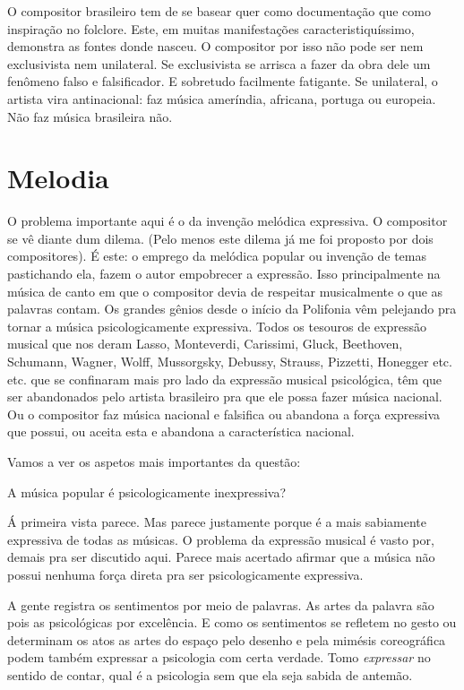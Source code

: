 O compositor brasileiro tem de se basear quer como documentação que como
inspiração no folclore. Este, em muitas manifestações
caracteristiquíssimo, demonstra as fontes donde nasceu. O compositor por
isso não pode ser nem exclusivista nem unilateral. Se exclusivista se
arrisca a fazer da obra dele um fenômeno falso e falsificador. E
sobretudo facilmente fatigante. Se unilateral, o artista vira
antinacional: faz música ameríndia, africana, portuga ou europeia. Não
faz música brasileira não.

\section{Melodia}

O problema importante aqui é o da invenção melódica expressiva. O
compositor se vê diante dum dilema. (Pelo menos este dilema já me foi
proposto por dois compositores). É este: o emprego da melódica popular
ou invenção de temas pastichando ela, fazem o autor empobrecer a
expressão. Isso principalmente na música de canto em que o compositor
devia de respeitar musicalmente o que as palavras contam. Os grandes
gênios desde o início da Polifonia vêm pelejando pra tornar a música
psicologicamente expressiva. Todos os tesouros de expressão musical que
nos deram Lasso, Monteverdi, Carissimi, Gluck, Beethoven, Schumann,
Wagner, Wolff, Mussorgsky, Debussy, Strauss, Pizzetti, Honegger etc.
etc. que se confinaram mais pro lado da expressão musical psicológica,
têm que ser abandonados pelo artista brasileiro pra que ele possa fazer
música nacional. Ou o compositor faz música nacional e falsifica ou
abandona a força expressiva que possui, ou aceita esta e abandona a
característica nacional.

Vamos a ver os aspetos mais importantes da questão:

A música popular é psicologicamente inexpressiva?

Á primeira vista parece. Mas parece justamente porque é a mais
sabiamente expressiva de todas as músicas. O problema da expressão
musical é vasto por, demais pra ser discutido aqui. Parece mais acertado
afirmar que a música não possui nenhuma força direta pra ser
psicologicamente expressiva.

A gente registra os sentimentos por meio de palavras. As artes da
palavra são pois as psicológicas por excelência. E como os sentimentos
se refletem no gesto ou determinam os atos as artes do espaço pelo
desenho e pela mimésis coreográfica podem também expressar a psicologia
com certa verdade. Tomo \emph{expressar} no sentido de contar, qual é a
psicologia sem que ela seja sabida de antemão.

